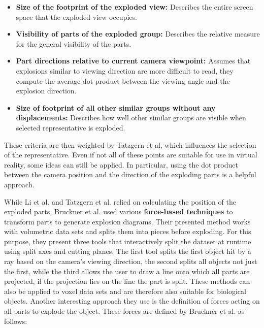 \begin{itemize}
	\item \textbf{Size of the footprint of the exploded view:} Describes the entire screen space that the exploded view occupies.
	\item \textbf{Visibility of parts of the exploded group:} Describes the relative measure for the general visibility of the parts.
	\item \textbf{Part directions relative to current camera viewpoint:} Assumes that explosions similar to viewing direction are more difficult to read, they compute the average dot product between the viewing angle and the explosion direction.
	\item \textbf{Size of footprint of all other similar groups without any displacements:} Describes how well other similar groups are visible when selected representative is exploded.
\end{itemize}

These criteria are then weighted by Tatzgern et al, which influences the selection of the representative.
Even if not all of these points are suitable for use in virtual reality, some ideas can still be applied. In particular, using the dot product between the camera position and the direction of the exploding parts is a helpful approach.

While Li et al. and Tatzgern et al. relied on calculating the position of the exploded parts, Bruckner et al. used various \textbf{force-based techniques} to transform parts to generate explosion diagrams. %
Their presented method works with volumetric data sets and splits them into pieces before exploding. 
For this purpose, they present three tools that interactively split the dataset at runtime using split axes and cutting planes. 
The first tool splits the first object hit by a ray based on the camera's viewing direction, the second splits all objects not just the first, while the third allows the user to draw a line onto which all parts are projected, if the projection lies on the line the part is split. 
These methods can also be applied to voxel data sets and are therefore also suitable for biological objects.
Another interesting approach they use is the definition of forces acting on all parts to explode the object.
These forces are defined by Bruckner et al. as follows:

